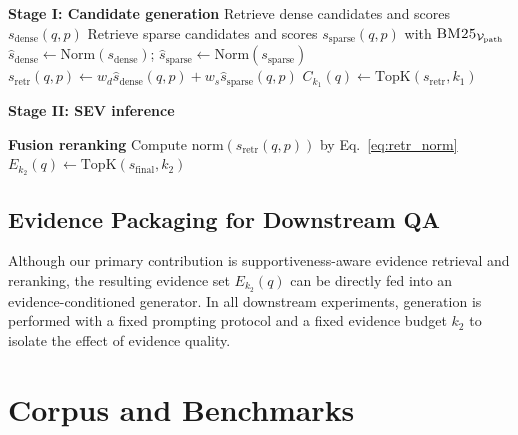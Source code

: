 \documentclass[preprint,12pt,a4paper]{elsarticle}
\begin{document}
\begin{algorithm}[H]
\caption{\textsc{YpathRAG}: Retrieval and Supportiveness-Aware Reranking}
\label{alg:ypathrag}

\textbf{Stage I: Candidate generation}\;
Retrieve dense candidates and scores $s_{\text{dense}}(q,p)$\;
Retrieve sparse candidates and scores $s_{\text{sparse}}(q,p)$ with $\textsc{BM25}_{\mathcal{V}_{\text{path}}}$\;
$\widehat{s}_{\text{dense}}\leftarrow \mathrm{Norm}(s_{\text{dense}})$;\;
$\widehat{s}_{\text{sparse}}\leftarrow \mathrm{Norm}(s_{\text{sparse}})$\;
$s_{\text{retr}}(q,p)\leftarrow w_d\widehat{s}_{\text{dense}}(q,p)+w_s\widehat{s}_{\text{sparse}}(q,p)$\;
$C_{k_1}(q)\leftarrow \mathrm{TopK}(s_{\text{retr}}, k_1)$\;

\textbf{Stage II: SEV inference}\;

\textbf{Fusion reranking}\;
Compute $\mathrm{norm}(s_{\text{retr}}(q,p))$ by Eq.~\eqref{eq:retr_norm}\;
$E_{k_2}(q)\leftarrow \mathrm{TopK}(s_{\text{final}}, k_2)$\;
\end{algorithm}

\subsection{Evidence Packaging for Downstream QA}
\label{sec:method:qa_optional}
Although our primary contribution is supportiveness-aware evidence retrieval and reranking, the resulting evidence set $E_{k_2}(q)$ can be directly fed into an evidence-conditioned generator.
In all downstream experiments, generation is performed with a fixed prompting protocol and a fixed evidence budget $k_2$ to isolate the effect of evidence quality.

\section{Corpus and Benchmarks}
\label{sec:corpus_bench}
\end{document}
